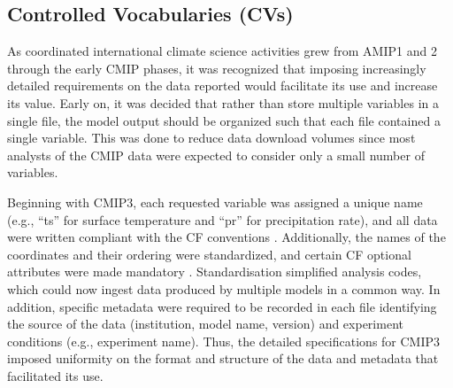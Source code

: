 \documentclass[manuscript]{copernicus}
\newcommand{\mycomment}[1]{}
\def\cred#1{{\color{red}#1}}
\begin{document}
\subsection{Controlled Vocabularies (CVs)}
\label{sec:CMIPCVs}
\mycomment{
\textbf{Attn: IPSL folks; MIP era realm evolution, dovetailing Variable request section}
Google docs yet to be finalized
CMIP6 global atts - https://docs.google.com/document/d/1h0r8RZr_f3-8egBMMh7aqLwy3snpD6_MrDz1q8n5XUk/edit
CMIP6 output metadata reqs - https://docs.google.com/document/d/1os9rZ11U0ajY7F8FWtgU4B49KcB59aFlBVGfLC4ahXs/edit
XML filenames/exps across eras - https://docs.google.com/document/d/1bUwK6G_fVZO53UjLZbQUOuBP47PsT8lqKKhL1pjRnKg/edit
CMIP5 standard output update - https://docs.google.com/document/d/1qOrdq6YOv8Tyx_NuqfKEw_EFBX_cvp8WTmRDzfuqn5s/edit
}

As coordinated international climate science activities grew from AMIP1 and 2 through the early CMIP phases, it was recognized that imposing increasingly detailed requirements on the data reported would facilitate its use and increase its value. Early on, it was decided that rather than store multiple variables in a single file, the model output should be organized such that each file contained a single variable. This was done to reduce data download volumes since most analysts of the CMIP data were expected to consider only a small number of variables.

Beginning with CMIP3, each requested variable was assigned a unique name (e.g., “ts” for surface temperature and “pr” for precipitation rate), and all data were written compliant with the CF conventions \citep[e.g.,][]{taylor_pcmdi_2009}. Additionally, the names of the coordinates and their ordering were standardized, and certain CF optional attributes were made mandatory \citep[e.g., ``cell\_methods'';][]{eaton_netcdf_2024}. Standardisation simplified analysis codes, which could now ingest data produced by multiple models in a common way. In addition, specific metadata were required to be recorded in each file identifying the source of the data (institution, model name, version) and experiment conditions (e.g., experiment name). Thus, the detailed specifications for CMIP3 \citep[see][]{taylor_pcmdi_2005} imposed uniformity on the format and structure of the data and metadata that facilitated its use.
\end{document}
